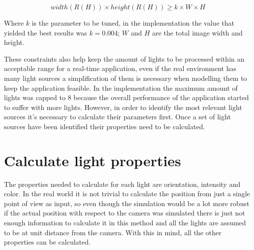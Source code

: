 \begin{equation}
    width(R(H)) \times height(R(H)) \geq k \times W \times H
\end{equation}

Where $k$ is the parameter to be tuned, in the implementation the value that yielded the best results was $k = 0.004$; $W$ and $H$ are the total image width and height.\newline

These constraints also help keep the amount of lights to be processed within an acceptable range for a real-time application, even if the real environment has many light sources a simplification of them is necessary when modelling them to keep the application feasible. In the implementation the maximum amount of lights was capped to 8 because the overall performance of the application started to suffer with more lights. However, in order to identify the most relevant light sources it's necessary to calculate their parameters first.\newline
Once a set of light sources have been identified their properties need to be calculated.

\section{Calculate light properties}
The properties needed to calculate for each light are orientation, intensity and color. In the real world it is not trivial to calculate the position from just a single point of view as input, so even though the simulation would be a lot more robust if the actual position with respect to the camera was simulated there is just not enough information to calculate it in this method and all the lights are assumed to be at unit distance from the camera. With this in mind, all the other properties can be calculated.

